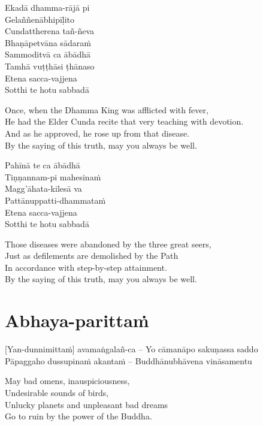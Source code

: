 Ekadā dhamma-rājā pi\\
Gelaññenābhipīḷito\\
Cundattherena tañ-ñeva\\
Bhaṇāpetvāna sādaraṁ\\
Sammoditvā ca ābādhā\\
Tamhā vuṭṭhāsi ṭhānaso\\
Etena sacca-vajjena\\
Sotthi te hotu sabbadā

\begin{english-verses}
  Once, when the Dhamma King was afflicted with fever,\\
  He had the Elder Cunda recite that very teaching with devotion.\\
  And as he approved, he rose up from that disease.\\
  By the saying of this truth, may you always be well.
\end{english-verses}

Pahīnā te ca ābādhā\\
Tiṇṇannam-pi mahesinaṁ\\
Magg'āhata-kilesā va\\
Pattānuppatti-dhammataṁ\\
Etena sacca-vajjena\\
Sotthi te hotu sabbadā

\begin{english-verses}
  Those diseases were abandoned by the three great seers,\\
  Just as defilements are demolished by the Path\\
  In accordance with step-by-step attainment.\\
  By the saying of this truth, may you always be well.
\end{english-verses}

\suttaRef{[Thai]}

\section{Abhaya-parittaṁ}
\label{abhaya-parittam}

\vspace{-0.6em}

[Yan-dunnimittaṁ] avamaṅgalañ-ca – Yo cāmanāpo sakuṇassa saddo\\
Pāpaggaho dussupinaṁ akantaṁ – Buddhānubhāvena vināsamentu

\begin{english-verses}
  May bad omens, inauspiciousness,\\
  Undesirable sounds of birds,\\
  Unlucky planets and unpleasant bad dreams\\
  Go to ruin by the power of the Buddha.
\end{english-verses}

